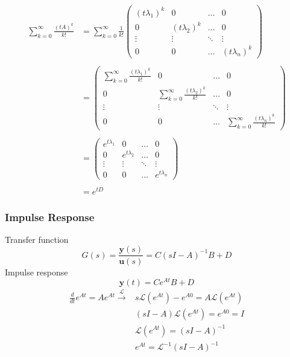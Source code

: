 \begin{ex}{}
\begin{equation*}
\begin{aligned}
\sum^{\infty}_{k=0}\frac{(tA)^{k}}{k!}  &=\sum^{\infty}_{k=0}\frac{1}{k!} \begin{pmatrix}
(t\lambda_{1})^{k}&0&\ldots&0\\
0&(t\lambda_{2})^{k}&\ldots&0\\
\vdots&\vdots&\ddots&\vdots\\
0&0&\ldots&(t\lambda_{n})^{k}
\end{pmatrix}\\\\
&=\begin{pmatrix}
\sum^{\infty}_{k=0}\frac{(t\lambda_{1})^{k}}{k!} &0&\ldots&0\\
0& \sum^{\infty}_{k=0}\frac{(t\lambda_{2})^{k}}{k!}&\ldots&0\\
\vdots&\vdots&\ddots&\vdots\\
0&0&\ldots&\sum^{\infty}_{k=0}\frac{(t\lambda_{n})^{k}}{k!}
\end{pmatrix}\\\\
&=\begin{pmatrix}
e^{t\lambda_{1}}&0&\ldots&0\\
0&e^{t\lambda_{2}}&\ldots&0\\
\vdots&\vdots&\ddots&\vdots\\
0&0&\ldots&e^{t\lambda_{n}}
\end{pmatrix}\\\\
&= e^{tD}
\end{aligned}
\end{equation*}
\end{ex}


\subsubsection{Impulse Response}
Transfer function\[G(s) = \frac{\mathbf{y}(s)}{\mathbf{u}(s)}=C(sI-A)^{-1}B+D\]
Impulse response\[\mathbf{y}(t) = Ce^{At}B+D\]
\begin{equation*}
\begin{split}
    \frac{d}{dt}e^{At} = Ae^{At} \xrightarrow{\mathcal{L}} & s\mathcal{L}(e^{At})-e^{A0} = A\mathcal{L}(e^{At})\\
    &(sI-A)\mathcal{L}(e^{At}) = e^{A0} = I\\
    &\mathcal{L}(e^{At}) = (sI-A)^{-1}\\
    &e^{At} = \mathcal{L}^{-1}(sI-A)^{-1}\\
\end{split}
\end{equation*}

